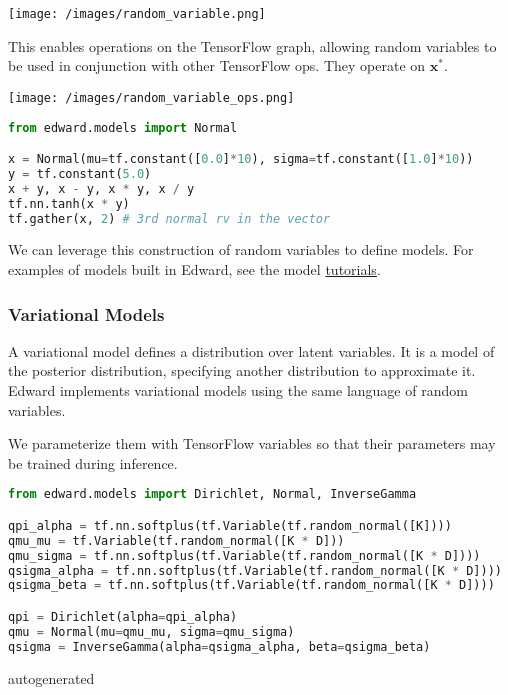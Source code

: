 \texttt{[image: /images/random\_variable.png]}

This enables operations on the TensorFlow graph, allowing random
variables to be used in conjunction with other TensorFlow ops. They
operate on $\mathbf{x}^*$.

\texttt{[image: /images/random\_variable\_ops.png]}

\begin{lstlisting}[language=Python]
from edward.models import Normal

x = Normal(mu=tf.constant([0.0]*10), sigma=tf.constant([1.0]*10))
y = tf.constant(5.0)
x + y, x - y, x * y, x / y
tf.nn.tanh(x * y)
tf.gather(x, 2) # 3rd normal rv in the vector
\end{lstlisting}

We can leverage this construction of random variables to define
models.
For examples of models built in Edward, see the model
\href{/tutorials/}{tutorials}.

\subsubsection{Variational Models}

A variational model defines a distribution over latent variables. It
is a model of the posterior distribution, specifying another
distribution to approximate it.
Edward implements variational models using the same language of random
variables.

We parameterize them with TensorFlow variables so that their
parameters may be trained during inference.

\begin{lstlisting}[language=Python]
from edward.models import Dirichlet, Normal, InverseGamma

qpi_alpha = tf.nn.softplus(tf.Variable(tf.random_normal([K])))
qmu_mu = tf.Variable(tf.random_normal([K * D]))
qmu_sigma = tf.nn.softplus(tf.Variable(tf.random_normal([K * D])))
qsigma_alpha = tf.nn.softplus(tf.Variable(tf.random_normal([K * D])))
qsigma_beta = tf.nn.softplus(tf.Variable(tf.random_normal([K * D])))

qpi = Dirichlet(alpha=qpi_alpha)
qmu = Normal(mu=qmu_mu, sigma=qmu_sigma)
qsigma = InverseGamma(alpha=qsigma_alpha, beta=qsigma_beta)
\end{lstlisting}

{{autogenerated}}
